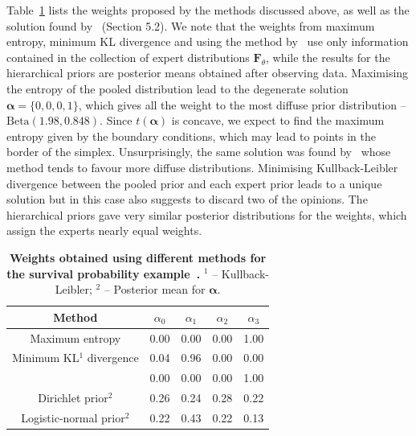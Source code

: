 \documentclass[a4paper, notitlepage, 10pt]{article}
\begin{document}
Table~\ref{tab:alphasBeta} lists the weights proposed by the methods discussed above, as well as the solution found by~\cite{rufo2012B} (Section 5.2).
We note that the weights from maximum entropy, minimum KL divergence and using the method by~\cite{rufo2012B} use only information contained in the collection of expert distributions $\boldsymbol F_{\theta}$, while the results for the hierarchical priors are posterior means obtained after observing data.
Maximising the entropy of the pooled distribution lead to the degenerate solution $\boldsymbol \alpha = \{0, 0, 0, 1 \}$, which gives all the weight to the most diffuse prior distribution -- $\text{Beta}(1.98, 0.848)$.
Since $t(\boldsymbol\alpha)$ is concave, we expect to find the maximum entropy given by the boundary conditions, which may lead to points in the border of the simplex.
Unsurprisingly, the same solution was found by~\cite{rufo2012B} whose method tends to favour more diffuse distributions.
Minimising Kullback-Leibler divergence between the pooled prior and each expert prior leads to a unique solution but in this case also suggests to discard two of the opinions.
The hierarchical priors gave very similar posterior distributions for the weights, which assign the experts nearly equal weights.

\begin{table}[ht]
\caption{\textbf{Weights obtained using different methods for the survival probability example~\citep{savchuk1994}.}
$^1$ -- Kullback-Leibler; $^2$ -- Posterior mean for $\boldsymbol\alpha$.}
\centering
\begin{tabular}{ccccc}
  \hline
Method  & $\alpha_0$ & $\alpha_1$ & $\alpha_2$ & $\alpha_3$ \\ 
  \hline
Maximum entropy & 0.00 & 0.00 & 0.00 & 1.00 \\ 
Minimum KL$^1$ divergence & 0.04 & 0.96 & 0.00 & 0.00 \\
\cite{rufo2012A} & 0.00 & 0.00 & 0.00& 1.00\\
Dirichlet prior$^2$ & 0.26 & 0.24 & 0.28 & 0.22 \\ 
Logistic-normal prior$^2$ & 0.22 & 0.43 & 0.22 & 0.13\\
 \hline
\end{tabular}
\label{tab:alphasBeta}
\end{table}
\end{document}

